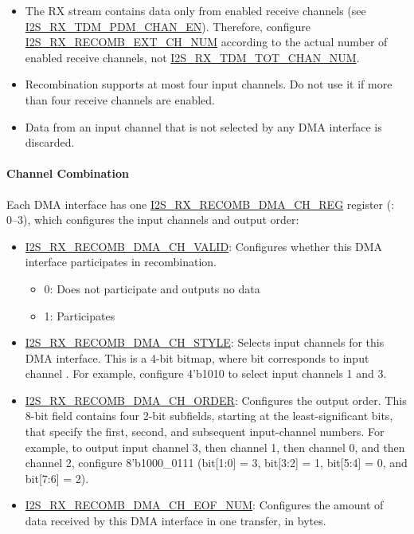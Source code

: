 \documentclass[main\_\_EN.tex]{subfiles}
\begin{document}
\begin{tiplisting}
\begin{itemize}
    \item The RX stream contains data only from enabled receive channels (see \hyperref[fielddesc:I2SRXTDMPDMCHAN0EN]{I2S\_RX\_TDM\_PDM\_CHAN\_EN}). Therefore, configure \hyperref[fielddesc:I2SRXRECOMBEXTCHNUM]{I2S\_RX\_RECOMB\_EXT\_CH\_NUM} according to the actual number of enabled receive channels, not \hyperref[fielddesc:I2SRXTDMTOTCHANNUM]{I2S\_RX\_TDM\_TOT\_CHAN\_NUM}.
    \item Recombination supports at most four input channels. Do not use it if more than four receive channels are enabled.
    \item Data from an input channel that is not selected by any DMA interface is discarded.
\end{itemize}
\end{tiplisting}

\paragraph{Channel Combination}

Each DMA interface has one \hyperref[regdesc:I2SRXRECOMBDMACH0REG]{I2S\_RX\_RECOMB\_DMA\_CH\_REG} register (: 0--3), which configures the input channels and output order:
\begin{itemize}
    \item \hyperref[fielddesc:I2SRXRECOMBDMACH0VALID]{I2S\_RX\_RECOMB\_DMA\_CH\_VALID}: Configures whether this DMA interface participates in recombination.
    \begin{itemize}
        \item 0: Does not participate and outputs no data
        \item 1: Participates
    \end{itemize}
    \item \hyperref[fielddesc:I2SRXRECOMBDMACH0STYLE]{I2S\_RX\_RECOMB\_DMA\_CH\_STYLE}: Selects input channels for this DMA interface. This is a 4-bit bitmap, where bit  corresponds to input channel . For example, configure 4'b1010 to select input channels 1 and 3.
    \item \hyperref[fielddesc:I2SRXRECOMBDMACH0ORDER]{I2S\_RX\_RECOMB\_DMA\_CH\_ORDER}: Configures the output order. This 8-bit field contains four 2-bit subfields, starting at the least-significant bits, that specify the first, second, and subsequent input-channel numbers. For example, to output input channel 3, then channel 1, then channel 0, and then channel 2, configure 8'b1000\_0111 (bit[1:0] = 3, bit[3:2] = 1, bit[5:4] = 0, and bit[7:6] = 2).
    \item \hyperref[fielddesc:I2SRXRECOMBDMACH0EOFNUM]{I2S\_RX\_RECOMB\_DMA\_CH\_EOF\_NUM}: Configures the amount of data received by this DMA interface in one transfer, in bytes.
\end{itemize}
\end{document}
